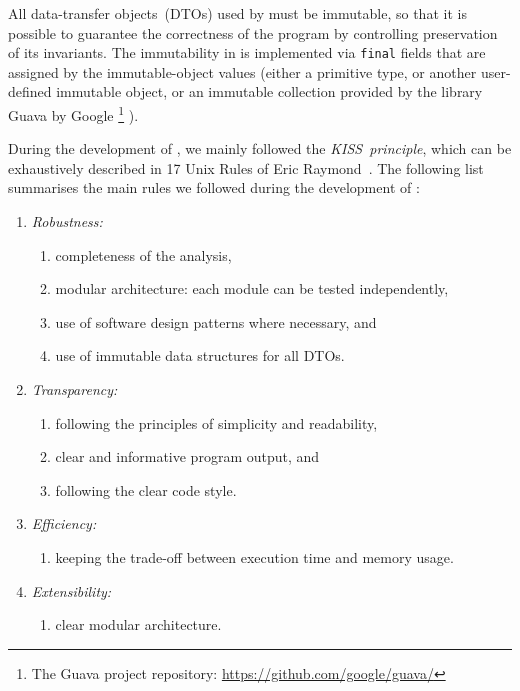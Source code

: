All data-transfer objects~(DTOs) used by \porthos[2] must be immutable, so that it is possible to guarantee the correctness of the program by controlling preservation of its invariants.
The immutability in \porthos[2] is implemented via \texttt{final} fields that are assigned by the immutable-object values (either a primitive type, or another user-defined immutable object, or an immutable collection provided by the library Guava by Google%
%
\footnote{The Guava project repository: \url{https://github.com/google/guava/}}%
%
).

During the development of \porthos[2], we mainly followed the \textit{KISS~principle}, which can be exhaustively described in 17 Unix Rules of Eric Raymond~\cite{raymond2003art}.
The following list summarises the main rules we followed during the development of \porthos[2]:

\vspace{0.5em}
\begin{enumerate}[nolistsep]
  \item \textit{Robustness:}
    \begin{enumerate}[label*=\arabic*.]
      \item completeness of the analysis,
      \item modular architecture: each module can be tested independently,
      \item use of software design patterns where necessary, and
      \item use of immutable data structures for all DTOs.
    \end{enumerate}
  \item \textit{Transparency:}
    \begin{enumerate}[label*=\arabic*.]
      \item following the principles of simplicity and readability,
      \item clear and informative program output, and
      \item following the clear code style.
    \end{enumerate}
  \item \textit{Efficiency:}
    \begin{enumerate}[label*=\arabic*.]%
      \item keeping the trade-off between execution time and memory usage.
    \end{enumerate}
  \item \textit{Extensibility:}
    \begin{enumerate}[label*=\arabic*.]%
      \item clear modular architecture.
    \end{enumerate}
\end{enumerate}

